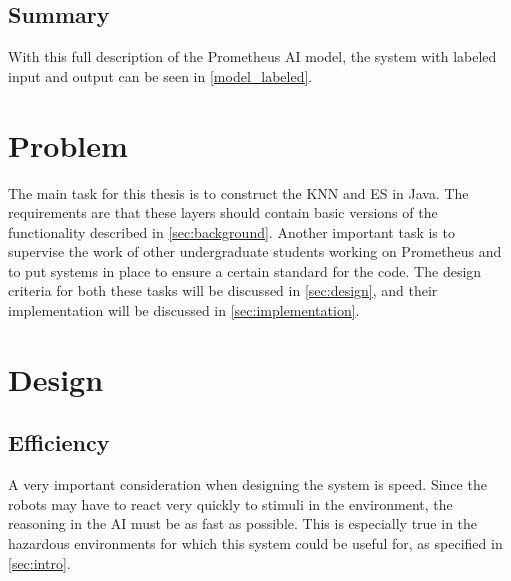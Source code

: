 \documentclass[titlepage,11pt]{article}
\begin{document}
\subsection{Summary}

With this full description of the Prometheus AI model, the system with labeled input and output can be seen in \autoref{model_labeled}.

\section{Problem}
\label{sec:problem}

The main task for this thesis is to construct the KNN and ES in Java. The requirements are that these layers should contain basic versions of the functionality described in \autoref{sec:background}. Another important task is to supervise the work of other undergraduate students working on Prometheus and to put systems in place to ensure a certain standard for the code. The design criteria for both these tasks will be discussed in \autoref{sec:design}, and their implementation will be discussed in \cref{sec:implementation}.

\section{Design}
\label{sec:design}

\subsection{Efficiency}
A very important consideration when designing the system is speed. Since the robots may have to react very quickly to stimuli in the environment, the reasoning in the AI must be as fast as possible. This is especially true in the hazardous environments for which this system could be useful for, as specified in \autoref{sec:intro}.
\end{document}

